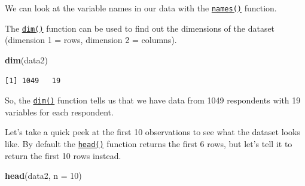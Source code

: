\documentclass[]{book}
\newenvironment{Shaded}{\begin{snugshade}}{\end{snugshade}}
\newcommand{\KeywordTok}[1]{\textcolor[rgb]{0.13,0.29,0.53}{\textbf{#1}}}
\newcommand{\DataTypeTok}[1]{\textcolor[rgb]{0.13,0.29,0.53}{#1}}
\newcommand{\DecValTok}[1]{\textcolor[rgb]{0.00,0.00,0.81}{#1}}
\newcommand{\NormalTok}[1]{#1}
\theoremstyle{definition}
\theoremstyle{definition}
\theoremstyle{definition}
\theoremstyle{remark}
\begin{document}
We can look at the variable names in our data with the
\href{http://bit.ly/R_names}{\texttt{names()}} function.

The \href{http://bit.ly/R_dim}{\texttt{dim()}} function can be used to
find out the dimensions of the dataset (dimension 1 = rows, dimension 2
= columns).

\begin{Shaded}
\begin{Highlighting}[]
\KeywordTok{dim}\NormalTok{(data2)}
\end{Highlighting}
\end{Shaded}

\begin{verbatim}
[1] 1049   19
\end{verbatim}

So, the \href{http://bit.ly/R_dim}{\texttt{dim()}} function tells us
that we have data from 1049 respondents with 19 variables for each
respondent.

Let's take a quick peek at the first 10 observations to see what the
dataset looks like. By default the
\href{http://bit.ly/R_head}{\texttt{head()}} function returns the first
6 rows, but let's tell it to return the first 10 rows instead.

\begin{Shaded}
\begin{Highlighting}[]
\KeywordTok{head}\NormalTok{(data2, }\DataTypeTok{n =} \DecValTok{10}\NormalTok{)}
\end{Highlighting}
\end{Shaded}
\end{document}
